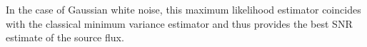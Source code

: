 In the case of Gaussian white noise, this maximum likelihood estimator coincides
with the classical minimum variance estimator and thus provides the best SNR
estimate of the source flux.


